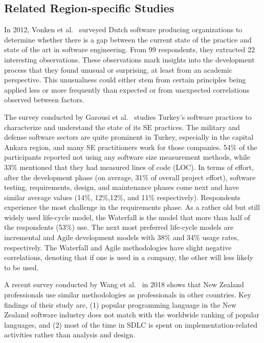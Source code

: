 \subsection{Related Region-specific Studies}
\label{region specific study}

In 2012, Vonken et al.~\citep{Vonken2012} surveyed Dutch software producing organizations to determine whether there is a gap between the current state of the practice and state of the art in software engineering. From 99 respondents, they extracted 22 interesting observations. These observations mark insights into the development process that they found unusual or surprising, at least from an academic perspective. This unusualness could either stem from certain principles being applied less or more frequently than expected or from unexpected correlations observed between factors.

The survey conducted by Garousi et al.~\citep{Garousi2015} studies Turkey's software practices to characterize and understand the state of its SE practices. The military and defense software sectors are quite prominent in Turkey, especially in the capital Ankara region, and many SE practitioners work for those companies. 54\% of the participants reported not using any software size measurement methods, while 33\% mentioned that they had measured lines of code (LOC). In terms of effort, after the development phase (on average, 31\% of overall project effort), software testing, requirements, design, and maintenance phases come next and have similar average values (14\%, 12\%,12\%, and 11\% respectively). Respondents experience the most challenge in the requirements phase. As a rather old but still widely used life-cycle model, the Waterfall is the model that more than half of the respondents (53\%) use. The next most preferred life-cycle models are incremental and Agile development models with 38\% and 34\% usage rates, respectively. The Waterfall and Agile methodologies have slight negative correlations, denoting that if one is used in a company, the other will less likely to be used.


A recent survey conducted by Wang et al.~\citep{Wang2018} in 2018 shows that New Zealand professionals use similar methodologies as professionals in other countries. Key findings of their study are, (1) popular programming language in the New Zealand software industry does not match with the worldwide ranking of popular languages, and (2) most of the time in SDLC is spent on implementation-related activities rather than analysis and design.

